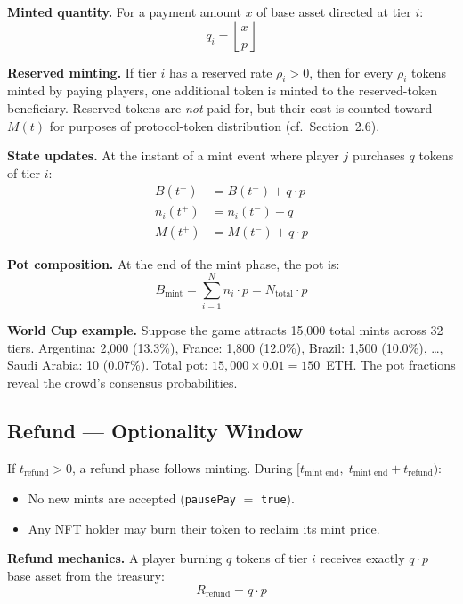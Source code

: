 \documentclass[11pt,a4paper]{article}
\begin{document}
\textbf{Minted quantity.} For a payment amount $x$ of base asset directed at tier $i$:
\begin{equation}
q_i = \left\lfloor \frac{x}{p} \right\rfloor
\end{equation}

\textbf{Reserved minting.} If tier $i$ has a reserved rate $\rho_i > 0$, then for every $\rho_i$ tokens minted by paying players, one additional token is minted to the reserved-token beneficiary. Reserved tokens are \emph{not} paid for, but their cost is counted toward $M(t)$ for purposes of protocol-token distribution (cf.\ Section~2.6).

\textbf{State updates.} At the instant of a mint event where player $j$ purchases $q$ tokens of tier $i$:
\begin{align}
B(t^+) &= B(t^-) + q \cdot p \\
n_i(t^+) &= n_i(t^-) + q \\
M(t^+) &= M(t^-) + q \cdot p
\end{align}

\textbf{Pot composition.} At the end of the mint phase, the pot is:
\begin{equation}
B_{\text{mint}} = \sum_{i=1}^{N} n_i \cdot p = N_{\text{total}} \cdot p
\end{equation}

\textbf{World Cup example.} Suppose the game attracts 15,000 total mints across 32 tiers. Argentina: 2,000 (13.3\%), France: 1,800 (12.0\%), Brazil: 1,500 (10.0\%), \ldots, Saudi Arabia: 10 (0.07\%). Total pot: $15{,}000 \times 0.01 = 150$~ETH. The pot fractions reveal the crowd's consensus probabilities.

\subsection{Refund --- Optionality Window}

If $t_{\text{refund}} > 0$, a refund phase follows minting. During $[t_{\text{mint\_end}},\; t_{\text{mint\_end}} + t_{\text{refund}})$:
\begin{itemize}[nosep]
    \item No new mints are accepted (\texttt{pausePay} $=$ \texttt{true}).
    \item Any NFT holder may burn their token to reclaim its mint price.
\end{itemize}

\textbf{Refund mechanics.} A player burning $q$ tokens of tier $i$ receives exactly $q \cdot p$ base asset from the treasury:
\begin{equation}
R_{\text{refund}} = q \cdot p
\end{equation}
\end{document}
